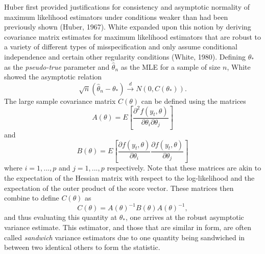 		Huber first provided justifications for consistency and asymptotic normality of maximum likelihood estimators under conditions weaker than had been previously shown (Huber, 1967). White
		expanded upon this notion by deriving covariance matrix estimates for maximum likelihood estimators that are robust to a variety of different types of misspecification and only assume
		conditional independence and certain other regularity conditions (White, 1980). Defining $\theta_*$ as the \textit{pseudo-true} parameter and $\hat{\theta}_n$ as the MLE for a sample of size
		$n$, White showed the asymptotic relation
		\begin{equation}
			\sqrt{n} (\hat{\theta}_n - \theta_*) \xrightarrow[]{d} N(0, C(\theta_* ) ) .
		\end{equation}
		The large sample covariance matrix $C(\theta)$ can be defined using the matrices 
		\begin{equation}
			A(\theta) = E \left[ \frac{\partial^2 f(y_t,\theta)}{\partial \theta_i \partial \theta_j} \right] 
		\end{equation}
		and
		\begin{equation}
			B(\theta) = E \left[ \frac{\partial f(y_t,\theta)}{\partial \theta_i} \frac{\partial f(y_t,\theta)}{\partial \theta_j} \right] 
		\end{equation}
		where $i = 1,...,p$ and $j = 1,...,p$ respectively. Note that these matrices are akin to the expectation of the Hessian matrix with respect to the log-likelihood and the expectation of
		the outer product of the score vector. These matrices then combine to define $C(\theta)$ as
		\begin{equation}
			C(\theta) = A(\theta)^{-1} B(\theta) A(\theta)^{-1} ,
		\end{equation}
		and thus evaluating this quantity at $\theta_*$, one arrives at the robust asymptotic variance estimate. This estimator, and those that are similar in form, are often called \textit{sandwich}
		variance estimators due to one quantity being sandwiched in between two identical others to form the statistic.

